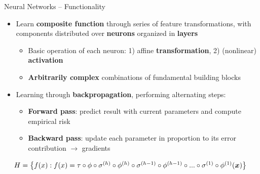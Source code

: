 \setdraft

\begin{frame}{Neural Networks -- Functionality}

 
 

\medskip

\begin{itemize}
  \item Learn \textbf{composite function} through series of feature 
  transformations, with components distributed over \textbf{neurons} organized 
  in \textbf{layers}
  \begin{itemize}
    \item Basic operation of each neuron: 1) affine \textbf{transformation}, 
    2) (nonlinear) \textbf{activation}
    \item \textbf{Arbitrarily complex} combinations of fundamental building 
    blocks
  \end{itemize}
  \item Learning through \textbf{backpropagation}, performing alternating steps:
  \begin{itemize}
    \item \textbf{Forward pass}: predict result with current parameters and 
    compute empirical risk 
    \item \textbf{Backward pass}: update each parameter in proportion to its 
    error contribution $\rightarrow$ gradients
  \end{itemize}
\end{itemize}

\medskip
 
 ~~
$H = \left\{ f(x): f(x) = \tau \circ \phi \circ \sigma^{(h)} \circ
\phi^{(h)} \circ \sigma^{(h - 1)} \circ \phi^{(h - 1)} \circ ... \circ 
\sigma^{(1)} \circ \phi^{(1)} (\bm{x}) \right\}$

\smallskip


\end{frame}
